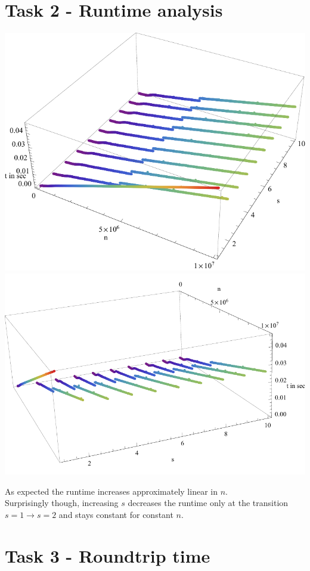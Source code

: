 \documentclass[10pt,a4paper]{article}
\begin{document}
\section{Task 2 - Runtime analysis}
\includegraphics[scale=0.5]{graph1.pdf}
\includegraphics[scale=0.5]{graph2.pdf}

As expected the runtime increases approximately linear in $n$.\\
Surprisingly though, increasing $s$ decreases the runtime only at the transition $s=1 \rightarrow s=2$ and stays constant for constant $n$.

\section{Task 3 - Roundtrip time}
\end{document}

